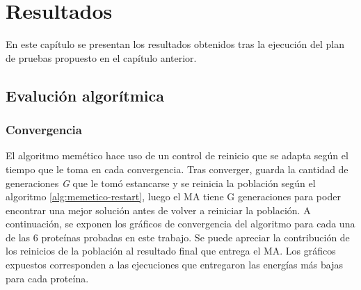 \chapter{Resultados}
\label{cap:resultados}
En este capítulo se presentan los resultados obtenidos tras la ejecución del plan de pruebas propuesto en el capítulo anterior.

\section{Evalución algorítmica}

\subsection{Convergencia}
El algoritmo memético hace uso de un control de reinicio que se adapta según el tiempo que le toma en cada convergencia. Tras converger, guarda la cantidad de generaciones \textit{G} que le tomó estancarse y se reinicia la población según el algoritmo \ref{alg:memetico-restart}, luego el MA tiene G generaciones para poder encontrar una mejor solución antes de volver a reiniciar la población. A continuación, se exponen los gráficos de convergencia del algoritmo para cada una de las 6 proteínas probadas en este trabajo. Se puede apreciar la contribución de los reinicios de la población al resultado final que entrega el MA. Los gráficos expuestos corresponden a las ejecuciones que entregaron las energías más bajas para cada proteína.

